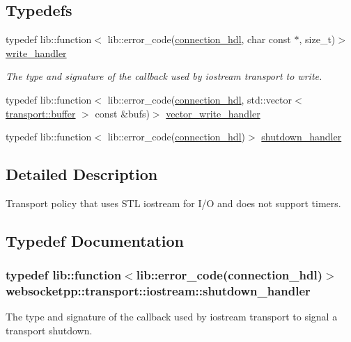 \subsection*{Typedefs}
\begin{DoxyCompactItemize}
\item 
typedef lib\+::function$<$ lib\+::error\+\_\+code(\hyperlink{namespacewebsocketpp_a6b3d26a10ee7229b84b776786332631d}{connection\+\_\+hdl}, char const $\ast$, size\+\_\+t)$>$ \hyperlink{namespacewebsocketpp_1_1transport_1_1iostream_abc22b834c2d0c698d6c87e51d5bfad2c}{write\+\_\+handler}
\begin{DoxyCompactList}\small\item\em The type and signature of the callback used by iostream transport to write. \end{DoxyCompactList}\item 
typedef lib\+::function$<$ lib\+::error\+\_\+code(\hyperlink{namespacewebsocketpp_a6b3d26a10ee7229b84b776786332631d}{connection\+\_\+hdl}, std\+::vector$<$ \hyperlink{structwebsocketpp_1_1transport_1_1buffer}{transport\+::buffer} $>$ const \&bufs)$>$ \hyperlink{namespacewebsocketpp_1_1transport_1_1iostream_a21982146513c0b5580786c3af5dd2878}{vector\+\_\+write\+\_\+handler}
\item 
typedef lib\+::function$<$ lib\+::error\+\_\+code(\hyperlink{namespacewebsocketpp_a6b3d26a10ee7229b84b776786332631d}{connection\+\_\+hdl})$>$ \hyperlink{namespacewebsocketpp_1_1transport_1_1iostream_a3563ce2cca06b1466f7d76ecb8eb4a0b}{shutdown\+\_\+handler}
\end{DoxyCompactItemize}


\subsection{Detailed Description}
Transport policy that uses S\+T\+L iostream for I/\+O and does not support timers. 

\subsection{Typedef Documentation}
\hypertarget{namespacewebsocketpp_1_1transport_1_1iostream_a3563ce2cca06b1466f7d76ecb8eb4a0b}{}
\subsubsection[{shutdown\+\_\+handler}]{\setlength{\rightskip}{0pt plus 5cm}typedef lib\+::function$<$lib\+::error\+\_\+code({\bf connection\+\_\+hdl})$>$ {\bf websocketpp\+::transport\+::iostream\+::shutdown\+\_\+handler}}\label{namespacewebsocketpp_1_1transport_1_1iostream_a3563ce2cca06b1466f7d76ecb8eb4a0b}
The type and signature of the callback used by iostream transport to signal a transport shutdown. 

